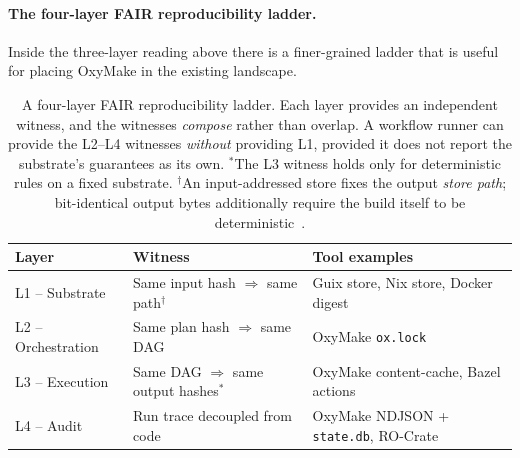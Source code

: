 \documentclass[12pt,a4paper]{article}
\newcommand{\code}[1]{{\texttt{\small\color{inlinecode}#1}}}
\begin{document}
\paragraph{The four-layer FAIR reproducibility ladder.}
Inside the three-layer reading above there is a finer-grained ladder
that is useful for placing OxyMake in the existing landscape.

\begin{table}[htbp]
\centering\small\setlength{\tabcolsep}{4pt}
\begin{tabular}{@{}lll@{}}
\toprule
\textbf{Layer} & \textbf{Witness} & \textbf{Tool examples} \\
\midrule
L1 -- Substrate    & Same input hash $\Rightarrow$ same path$^{\dagger}$ & Guix store, Nix store,
                                                                 Docker digest \\
L2 -- Orchestration & Same plan hash $\Rightarrow$ same DAG       & OxyMake \code{ox.lock} \\
L3 -- Execution    & Same DAG $\Rightarrow$ same output hashes$^{*}$ & OxyMake content-cache,
                                                                 Bazel actions \\
L4 -- Audit        & Run trace decoupled from code               & OxyMake NDJSON +
                                                                 \code{state.db}, RO-Crate \\
\bottomrule
\end{tabular}
\caption{A four-layer FAIR reproducibility ladder. Each layer
  provides an independent witness, and the witnesses
  \emph{compose} rather than overlap. A workflow runner can provide the
  L2--L4 witnesses \emph{without} providing L1, provided it does not
  report the substrate's guarantees as its own.
  $^{*}$The L3 witness holds only for deterministic rules on a fixed
  substrate. $^{\dagger}$An input-addressed store fixes the output
  \emph{store path}; bit-identical output bytes additionally require
  the build itself to be
  deterministic~\cite{nixosReproducibleBuilds}.}
\label{tab:fair-ladder}
\end{table}
\end{document}
